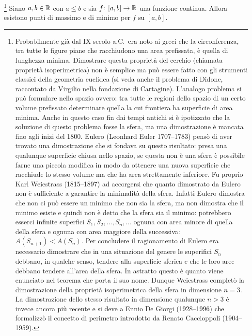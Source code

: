 \begin{theorem}[Weierstrass]%
\mymark{***}%
%
%
\footnote{%
Probabilmente già dal IX secolo a.C.\ era noto ai greci che la circonferenza, tra tutte le figure piane che racchiudono una area prefissata, è quella di lunghezza minima. Dimostrare questa proprietà del cerchio (chiamata proprietà isoperimetrica) non è semplice ma può essere fatto con gli strumenti classici della geometria euclidea (si veda anche il problema di Didone, raccontato da Virgilio nella fondazione di Cartagine).
%
%
%
L'analogo problema si può formulare nello spazio ovvero: tra tutte le regioni dello spazio di un certo volume prefissato determinare quella la cui frontiera ha superficie di area minima.
Anche in questo caso fin dai tempi antichi si è ipotizzato che la soluzione
di questo problema fosse la sfera, ma una dimostrazione è mancata fino agli inizi del 1800. Eulero (Leonhard Euler 1707--1783)
%
%
pensò di aver
trovato una dimostrazione
che si fondava su questo risultato:
presa una qualunque superficie chiusa nello spazio,
se questa non è una sfera è possibile
farne una piccola modifica in modo da ottenere una nuova superficie
che racchiude lo stesso volume ma che ha area strettamente inferiore.
Fu proprio Karl Weiestrass (1815--1897)
%
ad accorgersi che quanto dimostrato da Eulero non è sufficiente a garantire la minimalità della sfera. Infatti Eulero
dimostra che non ci può essere un minimo che non sia la sfera, ma non dimostra che il minimo esiste e quindi non è detto che la sfera sia il minimo: potrebbero esserci infinite superfici $S_1, S_2, \dots, S_n, \dots$ ognuna con area minore di quella della sfera e ognuna con area maggiore della successiva: $A(S_{n+1})< A(S_n)$. Per concludere il ragionamento di Eulero era necessario dimostrare che in una situazione del genere le superifici $S_n$ debbano, in qualche senso, tendere alla superficie sferica e che le loro aree debbano
tendere all'area della sfera. In astratto questo è quanto viene enunciato nel teorema che porta il suo nome.
Dunque Weiestrass completò la dimostrazione della proprietà isoperimetrica
della sfera in dimensione $n=3$.
La dimostrazione dello stesso risultato in dimensione qualunque $n>3$ è invece
ancora più recente e si deve a Ennio De Giorgi (1928--1996)
%
che formalizzò il concetto di perimetro introdotto
da Renato Caccioppoli (1904--1959).%
%
%
}
Siano $a,b\in \mathbb R$ con $a\le b$
e sia $f\colon [a,b]\to \mathbb R$ una funzione continua.
Allora
esistono punti di massimo e di minimo per $f$ su $[a,b]$.
\end{theorem}
